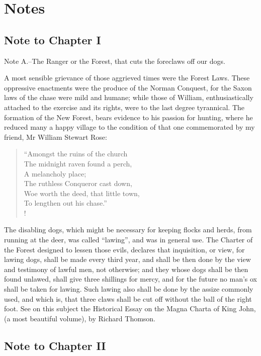 \chapter{Notes}

\section*{Note to Chapter I}\label{noteCI}

Note A.--The Ranger or the Forest, that cuts the foreclaws off our dogs.

A most sensible grievance of those aggrieved times were the Forest Laws.
These oppressive enactments were the produce of the Norman Conquest, for
the Saxon laws of the chase were mild and humane; while those of
William, enthusiastically attached to the exercise and its rights, were
to the last degree tyrannical. The formation of the New Forest, bears
evidence to his passion for hunting, where he reduced many a happy
village to the condition of that one commemorated by my friend, Mr
William Stewart Rose:

\begin{verse}
``Amongst the ruins of the church\\
The midnight raven found a perch,\\
A melancholy place;\\
The ruthless Conqueror cast down,\\
Woe worth the deed, that little town,\\
To lengthen out his chase.''\\!
\end{verse}

The disabling dogs, which might be necessary for keeping flocks and
herds, from running at the deer, was called ``lawing'', and was in
general use. The Charter of the Forest designed to lessen those evils,
declares that inquisition, or view, for lawing dogs, shall be made every
third year, and shall be then done by the view and testimony of lawful
men, not otherwise; and they whose dogs shall be then found unlawed,
shall give three shillings for mercy, and for the future no man's ox
shall be taken for lawing. Such lawing also shall be done by the assize
commonly used, and which is, that three claws shall be cut off without
the ball of the right foot. See on this subject the Historical Essay on
the Magna Charta of King John, (a most beautiful volume), by Richard
Thomson.

\section*{Note to Chapter II}\label{noteCII}

